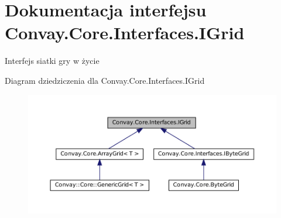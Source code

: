 \hypertarget{interface_convay_1_1_core_1_1_interfaces_1_1_i_grid}{}\section{Dokumentacja interfejsu Convay.\+Core.\+Interfaces.\+I\+Grid}
\label{interface_convay_1_1_core_1_1_interfaces_1_1_i_grid}


Interfejs siatki gry w życie  




Diagram dziedziczenia dla Convay.\+Core.\+Interfaces.\+I\+Grid
\nopagebreak
\begin{figure}[H]
\begin{center}
\leavevmode
\includegraphics[width=350pt]{interface_convay_1_1_core_1_1_interfaces_1_1_i_grid__inherit__graph}
\end{center}
\end{figure}
